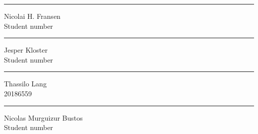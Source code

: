 \begin{titlingpage}
\begin{center}
\begin{minipage}{0.25\linewidth}
\end{minipage}
\hspace{10pt}
\vspace{20pt}
\begin{minipage}{0.25\linewidth}
	\centering
	\hrule
	\vspace{12pt}
	Nicolai H. Fransen\\
	Student number %
\end{minipage}
\hspace{10pt}
\begin{minipage}{0.25\linewidth}
	\centering
	\hrule
	\vspace{12pt}
	Jesper Kloster\\
	Student number %
\end{minipage}
\hspace{10pt}
\begin{minipage}{0.25\linewidth}
	\centering
	\hrule
	\vspace{12pt}
	Thassilo Lang\\ %
	20186559 %
\end{minipage}
\hspace{10pt}
\vspace{20pt}
\begin{minipage}{0.25\linewidth}
	\centering
	\hrule
	\vspace{12pt}
	Nicolas Murguizur Bustos\\ %
	Student number %
\end{minipage}


\end{center}

\end{titlingpage}

\clearpage
\tableofcontents












\printbibliography

